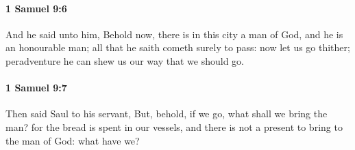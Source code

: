 		\paragraph{1 Samuel 9:6} %
			\label{1SAMUEL-9-6}

			And he said unto him, Behold now, there is in this city a man of God, and he is an honourable man; all that he saith cometh surely to pass: now let us go thither; peradventure he can shew us our way that we should go.


		\paragraph{1 Samuel 9:7} %
			\label{1SAMUEL-9-7}

			Then said Saul to his servant, But, behold, if we go, what shall we bring the man? for the bread is spent in our vessels, and there is not a present to bring to the man of God: what have we?

